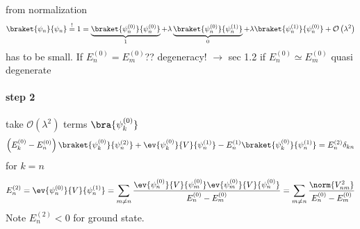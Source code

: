 from normalization
\begin{dmath}[]
	\braket{\psi_n}{\psi_n}\stackrel{!}{=}1=\underbrace{\braket{\psi_{n}^{(0)}}{\psi_{n}^{(0)}}}_{1}+\lambda\underbrace{\braket{\psi_{n}^{(0)}}{\psi_{n}^{(1)}}}_{0}+\lambda\braket{\psi_{n}^{(1)}}{\psi_{n}^{(0)}}+\mathcal{O}\left( \lambda^2 \right)
\end{dmath}
has to be small. If $E_{n}^{(0)}=E_{m}^{(0)}$?? degeneracy! $\to$ sec 1.2 if $E_{n}^{(0)}\simeq E_{m}^{(0)}$ quasi degenerate 

\paragraph{step 2}
take $\mathcal{O}(\lambda^2)$ terms $\bra{\psi_{k}^{(0)}}$
\begin{dmath}[]
	\left( E_{k}^{(0)}-E_{n}^{(0)} \right)\braket{\psi_{k}^{(0)}}{\psi_{n}^{(2)}} + \ev{\psi_{k}^{(0)}}{V}{\psi_{n}^{(1)}}-E_{n}^{(1)}\braket{\psi_{k}^{(0)}}{\psi_{n}^{(1)}}=E_{n}^{(2)}\delta_{kn}
\end{dmath}
for $k=n$
\begin{dmath}[]
	E_{n}^{(2)}=\ev{\psi_{n}^{(0)}}{V}{\psi_{n}^{(1)}}=\sum_{m\neq n}^{}\frac{\ev{\psi_{n}^{(0)}}{V}{\psi_{m}^{(0)}}\ev{\psi_{m}^{(0)}}{V}{\psi_{n}^{(0)}}}{E_{n}^{(0)}-E_{m}^{(0)}}=\sum_{m\neq n}^{}\frac{\norm{V_{nm}^2}}{E_{n}^{(0)}-E_{m}^{(0)}}
\end{dmath}
Note $E_{n}^{(2)}<0$ for ground state.

